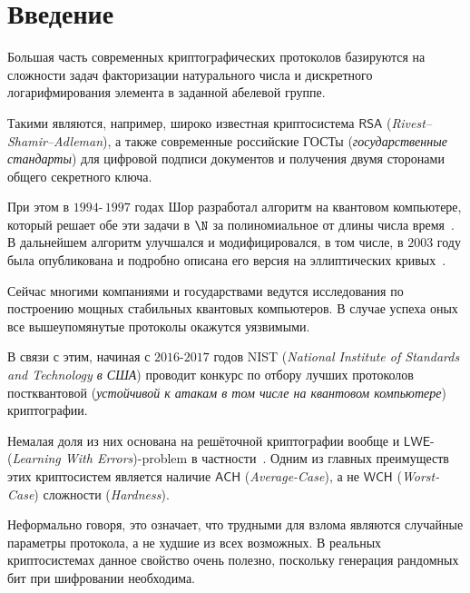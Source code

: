 \section{Введение}
\label{sec:Chapter0} 


Большая часть современных криптографических протоколов базируются на сложности задач факторизации натурального числа и дискретного логарифмирования элемента в заданной абелевой группе.

Такими являются, например, широко известная криптосистема $\mathsf{RSA}$ ({\it Rivest–Shamir–Adleman}), а также современные российские ГОСТы ({\it государственные стандарты}) для цифровой подписи документов и получения двумя сторонами общего секретного ключа.

При этом в $1994$\;-\,$1997$ годах Шор разработал алгоритм на квантовом компьютере, который решает обе эти задачи в $\N$ за полиномиальное от длины числа время~\cite{Shor}. В дальнейшем алгоритм улучшался и модифицировался, в том числе, в $2003$ году была опубликована и подробно описана его версия на эллиптических кривых~\cite{Ell_curves}.

Сейчас многими компаниями и государствами ведутся исследования по построению мощных стабильных квантовых компьютеров. В случае успеха оных все вышеупомянутые протоколы окажутся уязвимыми.

В связи с этим, начиная с $2016$\;-\:$2017$ годов NIST ({\it National Institute of Standards and Technology в США}) проводит конкурс по отбору лучших протоколов постквантовой ({\it устойчивой к атакам в том числе на квантовом компьютере}) криптографии.

Немалая доля из них основана на решёточной криптографии вообще и $\mathsf{LWE}$-({\it Learning With Errors})-problem в частности~\cite{LWE}. Одним из главных преимуществ этих криптосистем является наличие $\mathsf{ACH}$ ({\it Average-Case}), а не $\mathsf{WCH}$ ({\it Worst-Case}) сложности ({\it Hardness}).

Неформально говоря, это означает, что трудными для взлома являются случайные параметры протокола, а не худшие из всех возможных. В реальных криптосистемах данное свойство очень полезно, поскольку генерация рандомных бит при шифровании необходима.

